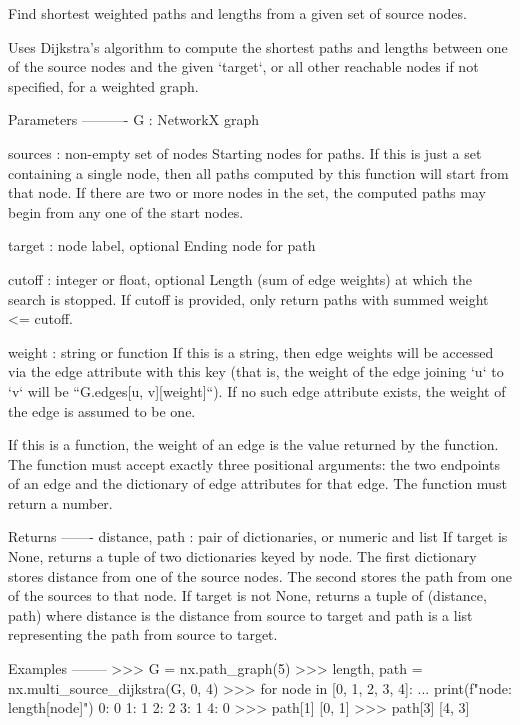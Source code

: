 \begin{DoxyVerb}Find shortest weighted paths and lengths from a given set of
source nodes.

Uses Dijkstra's algorithm to compute the shortest paths and lengths
between one of the source nodes and the given `target`, or all other
reachable nodes if not specified, for a weighted graph.

Parameters
----------
G : NetworkX graph

sources : non-empty set of nodes
    Starting nodes for paths. If this is just a set containing a
    single node, then all paths computed by this function will start
    from that node. If there are two or more nodes in the set, the
    computed paths may begin from any one of the start nodes.

target : node label, optional
    Ending node for path

cutoff : integer or float, optional
    Length (sum of edge weights) at which the search is stopped.
    If cutoff is provided, only return paths with summed weight <= cutoff.

weight : string or function
    If this is a string, then edge weights will be accessed via the
    edge attribute with this key (that is, the weight of the edge
    joining `u` to `v` will be ``G.edges[u, v][weight]``). If no
    such edge attribute exists, the weight of the edge is assumed to
    be one.

    If this is a function, the weight of an edge is the value
    returned by the function. The function must accept exactly three
    positional arguments: the two endpoints of an edge and the
    dictionary of edge attributes for that edge. The function must
    return a number.

Returns
-------
distance, path : pair of dictionaries, or numeric and list
    If target is None, returns a tuple of two dictionaries keyed by node.
    The first dictionary stores distance from one of the source nodes.
    The second stores the path from one of the sources to that node.
    If target is not None, returns a tuple of (distance, path) where
    distance is the distance from source to target and path is a list
    representing the path from source to target.

Examples
--------
>>> G = nx.path_graph(5)
>>> length, path = nx.multi_source_dijkstra(G, {0, 4})
>>> for node in [0, 1, 2, 3, 4]:
...     print(f"{node}: {length[node]}")
0: 0
1: 1
2: 2
3: 1
4: 0
>>> path[1]
[0, 1]
>>> path[3]
[4, 3]


\end{DoxyVerb}
